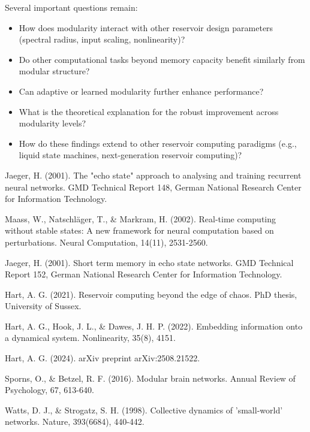 \documentclass{article}
\begin{document}
Several important questions remain:
\begin{itemize}
\item How does modularity interact with other reservoir design parameters (spectral radius, input scaling, nonlinearity)?
\item Do other computational tasks beyond memory capacity benefit similarly from modular structure?
\item Can adaptive or learned modularity further enhance performance?
\item What is the theoretical explanation for the robust improvement across modularity levels?
\item How do these findings extend to other reservoir computing paradigms (e.g., liquid state machines, next-generation reservoir computing)?
\end{itemize}


\begin{thebibliography}{9}

Jaeger, H. (2001).
The "echo state" approach to analysing and training recurrent neural networks.
GMD Technical Report 148, German National Research Center for Information Technology.

Maass, W., Natschläger, T., \& Markram, H. (2002).
Real-time computing without stable states: A new framework for neural computation based on perturbations.
Neural Computation, 14(11), 2531-2560.

Jaeger, H. (2001).
Short term memory in echo state networks.
GMD Technical Report 152, German National Research Center for Information Technology.

Hart, A. G. (2021).
Reservoir computing beyond the edge of chaos.
PhD thesis, University of Sussex.

Hart, A. G., Hook, J. L., \& Dawes, J. H. P. (2022).
Embedding information onto a dynamical system.
Nonlinearity, 35(8), 4151.

Hart, A. G. (2024).
arXiv preprint arXiv:2508.21522.

Sporns, O., \& Betzel, R. F. (2016).
Modular brain networks.
Annual Review of Psychology, 67, 613-640.

Watts, D. J., \& Strogatz, S. H. (1998).
Collective dynamics of 'small-world' networks.
Nature, 393(6684), 440-442.

\end{thebibliography}
\end{document}
